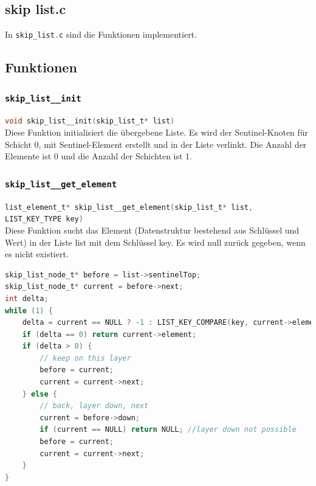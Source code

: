 \documentclass{TUBAFarbeiten}
\newcommand{\lstin}[1]{\lstinline[language=C]{#1}}
\begin{document}
\subsection{skip list.c}
In \lstin{skip_list.c} sind die Funktionen implementiert.

\subsection{Funktionen}

\subsubsection{\lstin{skip_list__init}}

\lstin{void skip_list__init(skip_list_t* list)} \\

Diese Funktion initialisiert die übergebene Liste. Es wird der Sentinel-Knoten für Schicht 0, mit Sentinel-Element erstellt und in der Liste verlinkt. Die Anzahl der Elemente ist 0 und die Anzahl der Schichten ist 1.

\subsubsection{\lstin{skip_list__get_element}}

\lstin{list_element_t* skip_list__get_element(skip_list_t* list, LIST_KEY_TYPE key)} \\

Diese Funktion sucht das Element (Datenstruktur bestehend aus Schlüssel und Wert) in der Liste list mit dem Schlüssel key. Es wird null zurück gegeben, wenn es nicht existiert. 

\begin{lstlisting}[language=C, frame=single, style=customc]
skip_list_node_t* before = list->sentinelTop;
skip_list_node_t* current = before->next;
int delta;
while (1) {
    delta = current == NULL ? -1 : LIST_KEY_COMPARE(key, current->element->key);
    if (delta == 0) return current->element;
    if (delta > 0) {
        // keep on this layer
        before = current;
        current = current->next;
    } else {
        // back, layer down, next
        current = before->down;
        if (current == NULL) return NULL; //layer down not possible
        before = current;
        current = current->next;
    }
}
\end{lstlisting}
\end{document}
